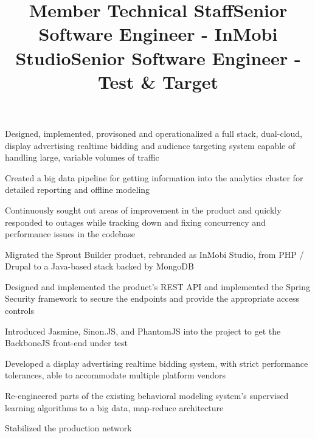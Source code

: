 \documentclass[margin,line]{resume}
\newenvironment{bullet-list}{
  \begin{list}{$\bullet$}{%
      \setlength{\itemsep}{0in}
      \setlength{\parsep}{0in} \setlength{\parskip}{0in}
      \setlength{\topsep}{0in} \setlength{\partopsep}{0in}
      \setlength{\leftmargin}{0.2in}}}{\end{list}}
\begin{document}
\begin{resume}
\title{Member Technical Staff}
\begin{position}
\vspace{-.3cm}
\begin{bullet-list}
\item Designed, implemented, provisoned and operationalized a full
stack, dual-cloud, display advertising realtime bidding and audience
targeting system capable of handling large, variable volumes of traffic
\item Created a big data pipeline for getting information
into the analytics cluster for detailed reporting and offline modeling
\item Continuously sought out areas of improvement in the product and
quickly responded to outages while tracking down and fixing concurrency
and performance issues in the codebase
\end{bullet-list}
\end{position}

\title{Senior Software Engineer - InMobi Studio}
\begin{position}
\vspace{-.3cm}
\begin{bullet-list}
\item Migrated the Sprout Builder product, rebranded as InMobi Studio,
from PHP / Drupal to a Java-based stack backed by MongoDB
\item Designed and implemented the product's REST API and implemented
the Spring Security framework to secure the endpoints and provide
the appropriate access controls
\item Introduced Jasmine, Sinon.JS, and PhantomJS into the project to
get the BackboneJS front-end under test
\end{bullet-list}
\end{position}

\title{Senior Software Engineer - Test \& Target}
\begin{position}
\vspace{-.3cm}
\begin{bullet-list}
\item Developed a display advertising realtime bidding system, with strict
performance tolerances, able to accommodate multiple platform vendors
\item Re-engineered parts of the existing behavioral modeling system's supervised
learning algorithms to a big data, map-reduce architecture
\item Stabilized the production network
\end{bullet-list}
\end{position}


\end{resume}
\end{document}
